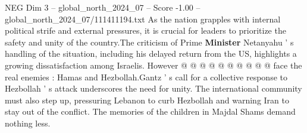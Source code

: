 \begin{textsample}{NEG Dim 3 – global\_north\_2024\_07 – Score -1.00 – global\_north\_2024\_07/111411194.txt}
As the nation grapples with internal political strife and external pressures, it is crucial for leaders to prioritize the safety and unity of the country.The criticism of Prime \textbf{Minister} Netanyahu ' s handling of the situation, including his delayed return from the US, highlights a growing dissatisfaction among Israelis.
However @ @ @ @ @ @ @ @ @ @ face the real enemies : Hamas and Hezbollah.Gantz ' s call for a collective response to Hezbollah ' s attack underscores the need for unity.
The international community must also step up, pressuring Lebanon to curb Hezbollah and warning Iran to stay out of the conflict.
The memories of the children in Majdal Shams demand nothing less.

\end{textsample}
